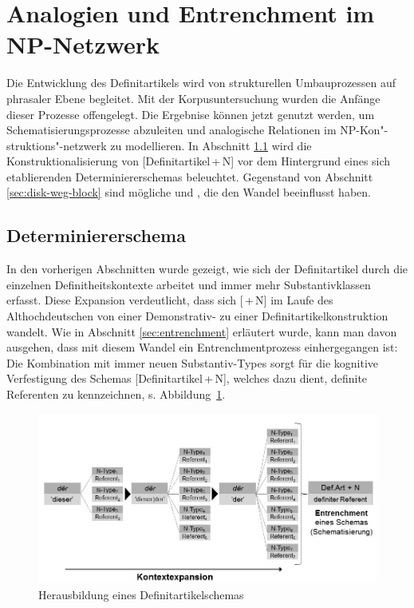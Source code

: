 \section{Analogien und Entrenchment im NP-Netzwerk} \label{sec:disk-ana-entrench}

Die Entwicklung des Definitartikels wird von strukturellen Umbauprozessen auf phrasaler Ebene begleitet. Mit der Korpusuntersuchung wurden die Anfänge dieser Prozesse offengelegt. Die Ergebnise können jetzt genutzt werden, um Schematisierungsprozesse abzuleiten und analogische Relationen im NP-Kon"-struktions"-netzwerk zu modellieren. In Abschnitt \ref{sec:disk-schema} wird die Konstruktionalisierung von [Definitartikel\,+\,N] vor dem Hintergrund eines sich etablierenden Determiniererschemas beleuchtet. Gegenstand von Abschnitt \ref{sec:disk-weg-block} sind mögliche  und , die den Wandel beeinflusst haben.  

\subsection{Determiniererschema} \label{sec:disk-schema}

In den vorherigen Abschnitten wurde gezeigt, wie sich der Definitartikel durch die einzelnen Definitheitskontexte arbeitet und immer mehr Substantivklassen erfasst. Diese Expansion verdeutlicht, dass sich [\,+\,N] im Laufe des Althochdeutschen von einer Demonstrativ- zu einer Definitartikelkonstruktion wandelt. 
Wie in Abschnitt \ref{sec:entrenchment} erläutert wurde, kann man davon ausgehen, dass mit diesem Wandel ein Entrenchmentprozess einhergegangen ist: Die Kombination mit immer neuen Substantiv-Types  sorgt für die kognitive Verfestigung des Schemas [Definitartikel\,+\,N], welches dazu dient, definite Referenten zu kennzeichnen, s. Abbildung~\ref{abb:entrenchment-ther}. 

\begin{figure}
\begin{center}
  \includegraphics[width=12cm]{images/entrenchment-def-N-neu-sw.jpg}
\caption {Herausbildung eines Definitartikelschemas} 
\label{abb:entrenchment-ther}
\end{center}
\end{figure} 

